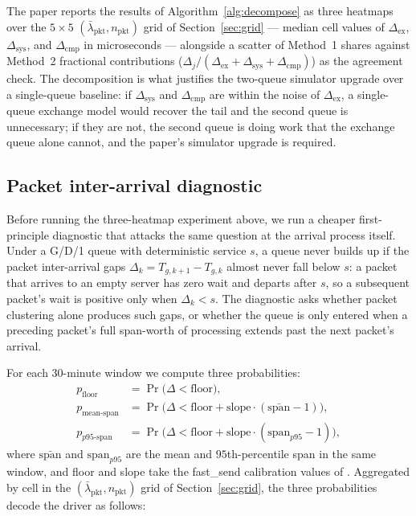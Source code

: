 \documentclass[11pt]{article}
\begin{document}
The paper reports the results of Algorithm~\ref{alg:decompose} as three heatmaps over the $5\times 5$ $(\bar\lambda_{\mathrm{pkt}}, n_{\mathrm{pkt}})$ grid of Section~\ref{sec:grid} --- median cell values of $\Delta_{\mathrm{ex}}$, $\Delta_{\mathrm{sys}}$, and $\Delta_{\mathrm{cmp}}$ in microseconds --- alongside a scatter of Method~1 shares against Method~2 fractional contributions ($\Delta_j / (\Delta_{\mathrm{ex}} + \Delta_{\mathrm{sys}} + \Delta_{\mathrm{cmp}})$) as the agreement check. The decomposition is what justifies the two-queue simulator upgrade over a single-queue baseline: if $\Delta_{\mathrm{sys}}$ and $\Delta_{\mathrm{cmp}}$ are within the noise of $\Delta_{\mathrm{ex}}$, a single-queue exchange model would recover the tail and the second queue is unnecessary; if they are not, the second queue is doing work that the exchange queue alone cannot, and the paper's simulator upgrade is required.

\subsection{Packet inter-arrival diagnostic}
\label{sec:upgrade-gap-diagnostic}

Before running the three-heatmap experiment above, we run a cheaper first-principle diagnostic that attacks the same question at the arrival process itself. Under a G/D/1 queue with deterministic service $s$, a queue never builds up if the packet inter-arrival gaps $\Delta_k = T_{g,k+1} - T_{g,k}$ almost never fall below $s$: a packet that arrives to an empty server has zero wait and departs after $s$, so a subsequent packet's wait is positive only when $\Delta_k < s$. The diagnostic asks whether packet clustering alone produces such gaps, or whether the queue is only entered when a preceding packet's full span-worth of processing extends past the next packet's arrival.

For each 30-minute window we compute three probabilities:
\begin{align*}
p_{\mathrm{floor}}          &= \Pr\bigl(\Delta < \text{floor}\bigr), \\
p_{\mathrm{mean\text{-}span}} &= \Pr\bigl(\Delta < \text{floor} + \text{slope} \cdot (\bar{\text{span}} - 1)\bigr), \\
p_{p95\text{-}\mathrm{span}}      &= \Pr\bigl(\Delta < \text{floor} + \text{slope} \cdot (\text{span}_{p95} - 1)\bigr),
\end{align*}
where $\bar{\text{span}}$ and $\text{span}_{p95}$ are the mean and $95$th-percentile span in the same window, and floor and slope take the fast\_send calibration values of \citet{mayeski_actorhft}. Aggregated by cell in the $(\bar\lambda_{\mathrm{pkt}}, n_{\mathrm{pkt}})$ grid of Section~\ref{sec:grid}, the three probabilities decode the driver as follows:
\end{document}
